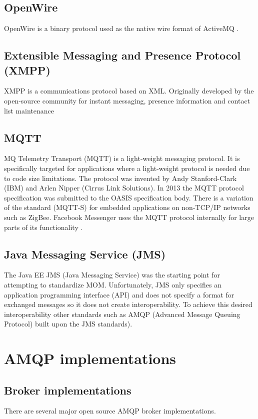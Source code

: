 \documentclass{thesis}
\begin{document}
\subsection{OpenWire}
OpenWire is a binary protocol used as the native wire format of ActiveMQ \cite{OPENWIRE}.

\subsection{Extensible Messaging and Presence Protocol (XMPP)}
XMPP is a communications protocol based on XML.  Originally developed by the open-source community for instant messaging, presence information and contact list maintenance \cite{XMPP}  

\subsection{MQTT}
MQ Telemetry Transport (MQTT) is a light-weight messaging protocol.  It is specifically targeted for applications where a light-weight protocol is needed due to code size limitations.  The protocol was invented by Andy Stanford-Clark (IBM) and Arlen Nipper (Cirrus Link Solutions).  In 2013 the MQTT protocol specification was submitted to the OASIS specification body.  There is a variation of the standard (MQTT-S) for embedded applications on non-TCP/IP networks such as ZigBee.  Facebook Messenger uses the MQTT protocol internally for large parts of its functionality \cite{MQTT}. 

\subsection{Java Messaging Service (JMS)}
The Java EE JMS (Java Messaging Service) was the starting point for attempting to standardize MOM. Unfortunately, JMS only specifies an application programming interface (API) and does not specify a format for exchanged messages so it does not create interoperability.   To achieve this desired interoperability other standards such as AMQP (Advanced Message Queuing Protocol) built upon the JMS standards). 

\section{AMQP implementations}

\subsection{Broker implementations}
There are several major open source AMQP broker implementations.  
\end{document}
